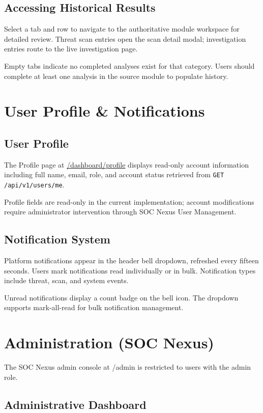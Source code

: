 \subsection{Accessing Historical Results}

Select a tab and row to navigate to the authoritative module workspace for detailed review. Threat scan entries open the scan detail modal; investigation entries route to the live investigation page.

Empty tabs indicate no completed analyses exist for that category. Users should complete at least one analysis in the source module to populate history.

\section{User Profile \& Notifications}

\subsection{User Profile}

The Profile page at \url{/dashboard/profile} displays read-only account information including full name, email, role, and account status retrieved from \texttt{GET /api/v1/users/me}.

Profile fields are read-only in the current implementation; account modifications require administrator intervention through SOC Nexus User Management.

\subsection{Notification System}

Platform notifications appear in the header bell dropdown, refreshed every fifteen seconds. Users mark notifications read individually or in bulk. Notification types include threat, scan, and system events.

Unread notifications display a count badge on the bell icon. The dropdown supports mark-all-read for bulk notification management.

\section{Administration (SOC Nexus)}

The SOC Nexus admin console at /admin is restricted to users with the admin role.

\subsection{Administrative Dashboard}


